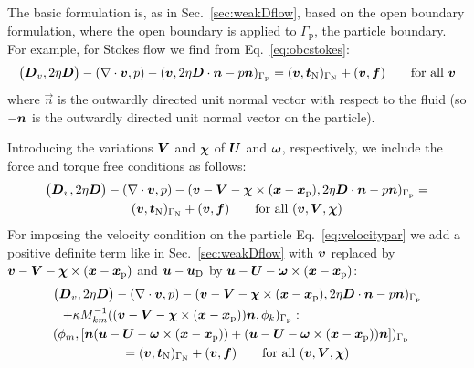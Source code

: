 The basic formulation is, as in Sec.~\ref{sec:weakDflow},
based on the open boundary formulation, where the open
boundary is applied to $\Gamma_\text{p}$, the particle boundary.
For example, for
Stokes flow we find from Eq.~\eqref{eq:obcstokes}:
\begin{equation}
  \big(\boldsymbol{D}_v,2\eta\boldsymbol{D}\big)
    -(\nabla\cdot\boldsymbol{v},p)
    -(\boldsymbol{v},2\eta \boldsymbol{D}\cdot\boldsymbol{n}-p\boldsymbol{n})_{\Gamma_{\text{p}}}=
(\boldsymbol{v},\boldsymbol{t}_{\text{N}})_{\Gamma_{\text{N}}}+(\boldsymbol{v},\boldsymbol{f})
\qquad\text{for all }\boldsymbol{v}
\label{eq:parbcstokes1}
\end{equation}
where $\vec n$ is the outwardly directed unit normal vector with respect to the
fluid (so $-\boldsymbol{n}$ is the outwardly directed unit normal vector on the
particle).

Introducing the variations $\boldsymbol{V}$ and $\boldsymbol{\chi}$ of $\boldsymbol{U}$ and
$\boldsymbol{\omega}$, respectively, we include the force and torque free conditions as
follows:
\begin{multline}
  \big(\boldsymbol{D}_v,2\eta\boldsymbol{D}\big)
    -(\nabla\cdot\boldsymbol{v},p)
    -(\boldsymbol{v}-\boldsymbol{V}-\boldsymbol{\chi}\times(\boldsymbol{x} - \boldsymbol{x}_\text{p}),
          2\eta \boldsymbol{D}\cdot\boldsymbol{n}-p\boldsymbol{n})_{\Gamma_{\text{p}}}=\\
(\boldsymbol{v},\boldsymbol{t}_{\text{N}})_{\Gamma_{\text{N}}}+(\boldsymbol{v},\boldsymbol{f})
\qquad\text{for all }(\boldsymbol{v}, \boldsymbol{V}, \boldsymbol{\chi})
\label{eq:parbcstokes2}
\end{multline}
For imposing the velocity condition on the particle 
Eq.~\eqref{eq:velocitypar} we add a positive definite term like in
Sec.~\ref{sec:weakDflow} with $\boldsymbol{v}$ replaced by $\boldsymbol{v}-\boldsymbol{V}-\boldsymbol{\chi}\times(\boldsymbol{x} - \boldsymbol{x}_\text{p})$ and
$\boldsymbol{u}-\boldsymbol{u}_\text{D}$ by
$\boldsymbol{u}-\boldsymbol{U}-\boldsymbol{\omega}\times(\boldsymbol{x} - \boldsymbol{x}_\text{p})$:
\begin{multline}
  \big(\ten D_v,2\eta\ten D\big)
    -(\nabla\cdot\vek v,p)
    -(\vek v-\vek V-\vek\chi\times(\vek x - \vek x_\text{p}),
          2\eta \ten D\cdot\vec n-p\vec n)_{\Gamma_{\text{p}}}\\
\shoveleft{
 +\kappa M_{km}^{-1}((\vec v-\vek V-\vek\chi\times(\vek x - \vek x_\text{p}))
\vec n,\phi_k)_{\Gamma_{\text{p}}}:}\\
\shoveright{(\phi_m,[\vek n(\vec u-\vek U-\vek\omega\times(\vek x - \vek
x_\text{p}))+(\vec u-\vek U-\vek\omega\times(\vek x - \vek
x_\text{p}))\vec n])_{\Gamma_{\text{p}}}}\\
=(\vek v,\vek t_{\text{N}})_{\Gamma_{\text{N}}}+(\vek v,\vek f)
\qquad\text{for all }(\vek v, \vek V, \vek\chi)
\label{eq:parbcstokes3}
\end{multline}
